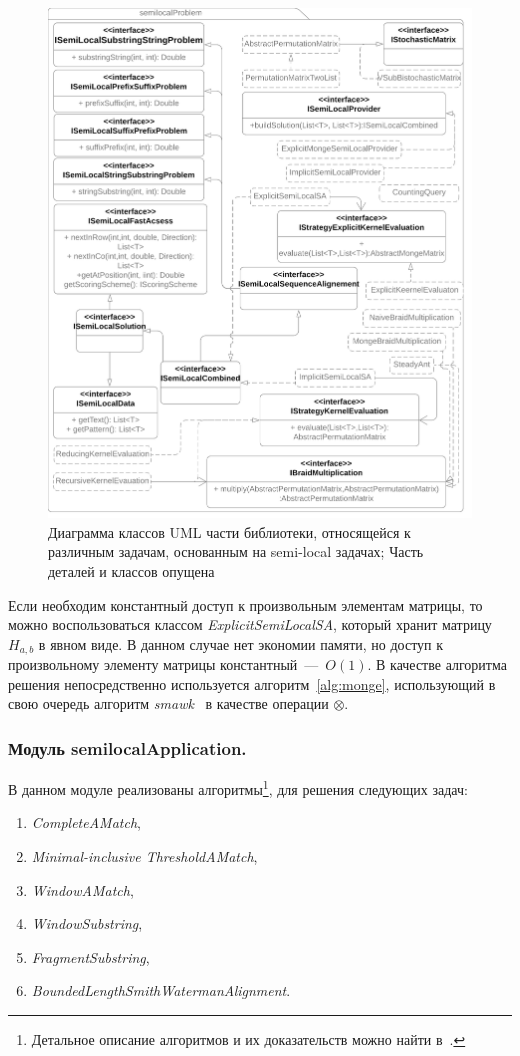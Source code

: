 \begin{figure}
  \centering
  \includegraphics[height=0.72\columnwidth,angle=90]{Mishin/figures/Library.png}
  \caption{Диаграмма классов UML части библиотеки, относящейся к различным задачам, основанным на  semi-local задачах; Часть деталей и классов опущена}\label{fig:libraryProblem}
\end{figure}

Если необходим константный доступ к произвольным элементам матрицы, то можно воспользоваться классом \emph{ExplicitSemiLocalSA}, который хранит матрицу $H_{a,b}$ в явном виде.
В данном случае нет экономии памяти, но доступ к произвольному элементу матрицы константный~---~$O(1)$. 
В качестве алгоритма решения непосредственно используется алгоритм~\ref{alg:monge}, использующий в свою очередь алгоритм \emph{smawk}~\cite{aggarwal1987geometric} в качестве операции $\otimes$.






\subsubsection{Модуль semilocalApplication.}
В данном модуле реализованы алгоритмы\footnote{Детальное описание алгоритмов и их доказательств можно найти в~\cite{tiskin2006all}.}, для решения следующих задач:
\begin{enumerate}
    \item \emph{CompleteAMatch},
    \item \emph{Minimal-inclusive ThresholdAMatch},
    \item \emph{WindowAMatch},
    \item \emph{WindowSubstring},
    \item \emph{FragmentSubstring},
    \item \emph{BoundedLengthSmithWatermanAlignment}.
\end{enumerate}

